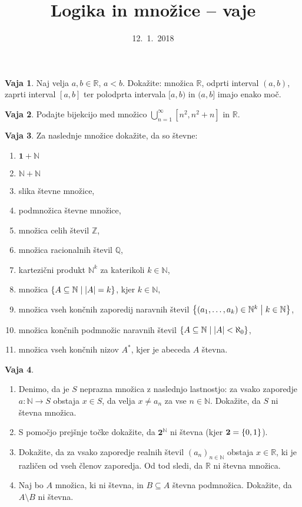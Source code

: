 \documentclass{article}
\newcommand{\NN}{\mathbb{N}}
\newcommand{\ZZ}{\mathbb{Z}}
\newcommand{\QQ}{\mathbb{Q}}
\newcommand{\RR}{\mathbb{R}}
\newcommand{\one}{\mathtt{\mathbf{1}}}
\newcommand{\two}{\mathtt{\mathbf{2}}}
\theoremstyle{definition}
\newtheorem{vaja}{Vaja}
\begin{document}
\title{Logika in množice -- vaje}
\date{12.~1.~2018}
\maketitle

\begin{vaja}
  Naj velja $a, b \in \RR$, $a < b$. Dokažite: množica $\RR$, odprti interval $(a,b)$, zaprti interval $[a,b]$ ter polodprta intervala $[a,b)$ in $(a,b]$ imajo enako moč.
\end{vaja}

\begin{vaja}
  Podajte bijekcijo med množico $\bigcup_{n = 1}^{\infty} [n^2, n^2 + n]$ in $\mathbb{R}$.
\end{vaja}

\begin{vaja}
  Za naslednje množice dokažite, da so števne:
  \begin{enumerate}
    \item
      $\one + \NN$
    \item
      $\NN + \NN$
    \item
   	  slika števne množice,
    \item
      podmnožica števne množice,
    \item
      množica celih števil $\ZZ$,
    \item
      množica racionalnih števil $\QQ$,

    \item
      kartezični produkt $\NN^k$ za katerikoli $k \in \NN$,
    \item
      množica $\set{A \subseteq \NN}{|A| = k}$, kjer $k \in \NN$,
    \item
      množica vseh končnih zaporedij naravnih števil $\set{(a_1, \ldots, a_k) \in \NN^k}{k \in \NN}$,
    \item
      množica končnih podmnožic naravnih števil $\set{A \subseteq \NN}{|A| < \aleph_0}$,
    \item
      množica vseh končnih nizov $A^*$, kjer je abeceda $A$ števna.
  \end{enumerate}
\end{vaja}

\begin{vaja}
  \
  \begin{enumerate}
    \item
      Denimo, da je $S$ neprazna množica z naslednjo lastnostjo: za vsako zaporedje $a\colon \NN \to S$ obstaja $x \in S$, da velja $x \neq a_n$ za vse $n \in \NN$. Dokažite, da $S$ ni števna množica.
    \item
      S pomočjo prejšnje točke dokažite, da $\two^\NN$ ni števna (kjer $\two = \set{0,1}$).
    \item
      Dokažite, da za vsako zaporedje realnih števil $(a_n)_{n \in \NN}$ obstaja $x \in \RR$, ki je različen od vseh členov zaporedja. Od tod sledi, da $\RR$ ni števna množica.
    \item
      Naj bo $A$ množica, ki ni števna, in $B \subseteq A$ števna podmnožica. Dokažite, da $A \setminus B$ ni števna.
  \end{enumerate}
\end{vaja}
\end{document}
